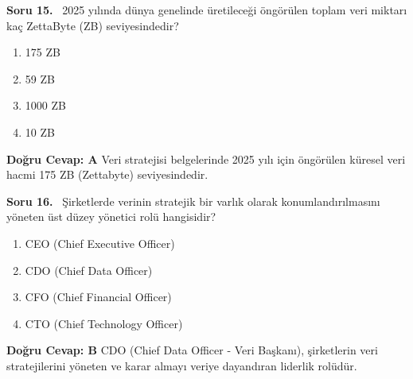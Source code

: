 \documentclass[11pt,a4paper,openany]{book}
\begin{document}
\needspace{5cm}
\vspace{8pt}
\noindent\textbf{\large\sffamily Soru 15.} \ 2025 yılında dünya genelinde üretileceği öngörülen toplam veri miktarı kaç ZettaByte (ZB) seviyesindedir?
\begin{enumerate}[label=\Alph*), leftmargin=25pt, topsep=4pt, itemsep=2pt]
    \item 175 ZB
    \item 59 ZB
    \item 1000 ZB
    \item 10 ZB
\end{enumerate}
\vspace{4pt}
\begin{tcolorbox}[title=Cevap ve Açıklama, colback=gray!3!white, colframe=primarycolor!90!black, arc=2mm, fonttitle=\bfseries\sffamily, top=6pt, bottom=6pt]
    \textbf{Doğru Cevap: A}
    \vspace{2pt}
    Veri stratejisi belgelerinde 2025 yılı için öngörülen küresel veri hacmi 175 ZB (Zettabyte) seviyesindedir.
\end{tcolorbox}
\vspace{10pt}

\needspace{5cm}
\vspace{8pt}
\noindent\textbf{\large\sffamily Soru 16.} \ Şirketlerde verinin stratejik bir varlık olarak konumlandırılmasını yöneten üst düzey yönetici rolü hangisidir?
\begin{enumerate}[label=\Alph*), leftmargin=25pt, topsep=4pt, itemsep=2pt]
    \item CEO (Chief Executive Officer)
    \item CDO (Chief Data Officer)
    \item CFO (Chief Financial Officer)
    \item CTO (Chief Technology Officer)
\end{enumerate}
\vspace{4pt}
\begin{tcolorbox}[title=Cevap ve Açıklama, colback=gray!3!white, colframe=primarycolor!90!black, arc=2mm, fonttitle=\bfseries\sffamily, top=6pt, bottom=6pt]
    \textbf{Doğru Cevap: B}
    \vspace{2pt}
    CDO (Chief Data Officer - Veri Başkanı), şirketlerin veri stratejilerini yöneten ve karar almayı veriye dayandıran liderlik rolüdür.
\end{tcolorbox}
\vspace{10pt}
\end{document}
